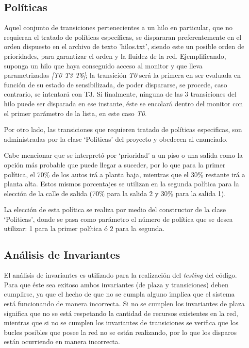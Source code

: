 \documentclass[12pt,a4paper]{article}
\begin{document}
\subsection{Políticas}
Aquel conjunto de transiciones pertenecientes a un hilo en particular, que no requieran el tratado de políticas específicas, se dispararan preferentemente en el orden dispuesto en el archivo de texto 'hilos.txt', siendo este un posible orden de prioridades, para garantizar el orden y la fluidez de la red. Ejemplificando, suponga un hilo que haya conseguido acceso al monitor y que lleva parametrizadas \textit{[T0    T3    T6]}; la transición \textit{T0} será la primera en ser evaluada en función de su estado de sensibilizada, de poder dispararse, se procede, caso contrario, se intentará con T3. Si finalmente, ninguna de las 3 transiciones del hilo puede ser disparada en ese instante, éste se encolará dentro del monitor con el primer parámetro de la lista, en este caso \textit{T0}.

Por otro lado, las transiciones que requieren tratado de políticas especificas, son administradas por la clase ‘Politicas’ del proyecto y obedecen al enunciado.

Cabe mencionar que se interpretó por ‘prioridad' a un piso o una salida como la opción más probable que puede llegar a suceder, por lo que para la primer política, el 70\% de los autos irá a planta baja, mientras que el 30\% restante irá a planta alta. Estos mismos porcentajes se utilizan en la segunda política para la elección de la calle de salida (70\% para la salida 2 y 30\% para la salida 1).

La elección de esta política se realiza por medio del constructor de la clase ‘Politicas’, donde se pasa como parámetro el número de política que se desea utilizar: 1 para la primer política ó 2 para la segunda.

\subsection{Análisis de Invariantes}
El análisis de invariantes es utilizado para la realización del \emph{testing} del código. Para que éste sea exitoso ambos invariantes (de plaza y transiciones) deben cumplirse, ya que el hecho de que no se cumpla alguno implica que el sistema está funcionando de manera incorrecta. Si no se cumplen los invariantes de plaza significa que no se está respetando la cantidad de recursos existentes en la red, mientras que si no se cumplen los invariantes de transiciones se verifica que los bucles posibles que posee la red no se están realizando, por lo que los disparos están ocurriendo en manera incorrecta. 
\end{document}
